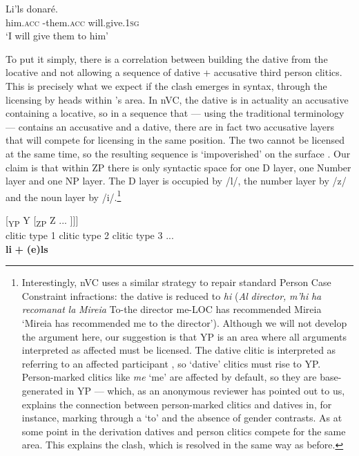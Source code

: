 \documentclass[output=paper,modfonts,nonflat,newtxmath,colorlinks,citecolor=brown]{langsci/langscibook}
\begin{document}
    \ex 
    \gll Li’ls    donaré.\\
    him.\textsc{acc} -them.\textsc{acc}   will.give.\textsc{1sg}  \\
    \glt  ‘I will give them to him’
    \z
    \z


To put it simply, there is a correlation between building the dative from the locative and not allowing a sequence of dative + accusative third person clitics. This is precisely what we expect if the clash emerges in syntax, through the licensing by heads within \citeauthor{Sportiche1996}’s area. In nVC, the dative is in actuality an accusative containing a locative, so in a sequence that — using the traditional terminology — contains an accusative and a dative, there are in fact two accusative layers that will compete for licensing in the same position. The two cannot be licensed at the same time, so the resulting sequence is ‘impoverished’ on the surface . Our claim is that within ZP there is only syntactic space for one D layer, one Number layer and one NP layer. The D layer is occupied by /l/, the number layer by /z/ and the noun layer by /i/.\footnote{Interestingly, nVC uses a similar strategy to repair standard Person Case Constraint infractions: the dative is reduced to \textit{hi} (\textit{Al} \textit{director,} \textit{m’hi} \textit{ha} \textit{recomanat} \textit{la} \textit{Mireia} To-the director me-LOC has recommended Mireia ‘Mireia has recommended me to the director’). Although we will not develop the argument here, our suggestion is that YP is an area where all arguments interpreted as affected must be licensed. The dative clitic is interpreted as referring to an affected participant \citep{AdgerHarbour2007}, so ‘dative’ clitics must rise to YP. Person-marked clitics like \textit{me} ‘me’ are affected by default, so they are base{}-generated in YP — which, as an anonymous reviewer has pointed out to us, explains the connection between person-marked clitics and datives in, for instance, marking through a ‘to’ and the absence of gender contrasts. As at some point in the derivation datives and person clitics compete for the same area. This explains the clash, which is resolved in the same way as before.}  

\ea%
    \label{ex:cabre:16}
    \ea \label{ex:cabre:16a}
    \gll {[\textsubscript{XP} X} { } {[\textsubscript{YP} Y} { }  {[\textsubscript{ZP}  Z} ...  ]]]\\
    \footnotesize {clitic type 1} { } \footnotesize {clitic type 2} { } \footnotesize   {clitic type 3} ...\\
    \glt  *\textbf{li} \textbf{+} \textbf{(e)ls}
    
\end{document}
